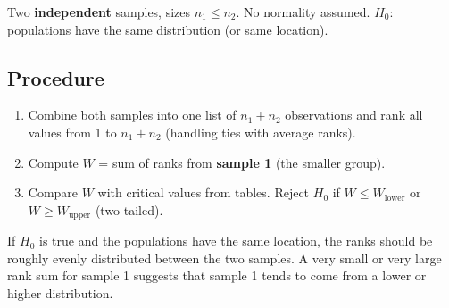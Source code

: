 \documentclass[12pt, a4paper, oneside]{book}
\theoremstyle{definition}
\theoremstyle{plain}
\theoremstyle{remark}
\begin{document}
Two \textbf{independent} samples, sizes $n_1\le n_2$.  No normality assumed.
$H_0$: populations have the same distribution (or same location).

\subsection{Procedure}

\begin{enumerate}[label=\textbf{Step \arabic*:}]
  \item Combine both samples into one list of $n_1+n_2$ observations and
        rank all values from 1 to $n_1+n_2$ (handling ties with average ranks).
  \item Compute $W$ = sum of ranks from \textbf{sample 1} (the smaller group).
  \item Compare $W$ with critical values from tables.
        Reject $H_0$ if $W\le W_{\text{lower}}$ or $W\ge W_{\text{upper}}$
        (two-tailed).
\end{enumerate}

\begin{intuition}
If $H_0$ is true and the populations have the same location, the ranks should
be roughly evenly distributed between the two samples.  A very small or very
large rank sum for sample 1 suggests that sample 1 tends to come from a
lower or higher distribution.
\end{intuition}
\end{document}
